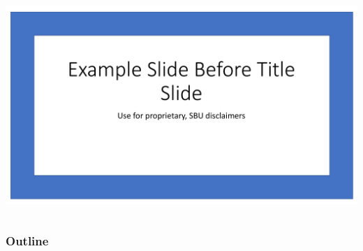 \ifnum{}
  \vspace{-0.1in}
  \begin{frame}
  \begin{columns}
  \includegraphics[width=1.0\textwidth,page=1]{Images/pre-titleslide.pdf}
  \end{columns}
  \end{frame}
\fi

\begin{frame}
\titlepage
\end{frame}


\begin{frame}\frametitle{Outline}
\tableofcontents
\end{frame}


